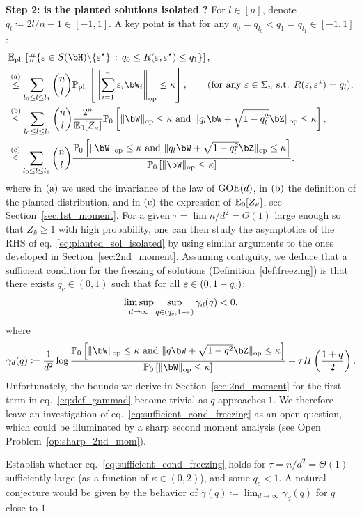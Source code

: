 \myskip
\textbf{Step 2: is the planted solutions isolated ?}
For $l \in [n]$, denote $q_l \coloneqq 2l/n - 1 \in [-1,1]$.
A key point is that for any $q_0 = q_{l_0} < q_1 = q_{l_1} \in [-1,1]$:
\begin{align}\label{eq:planted_sol_isolated}
    \nonumber
    &\EE_\pl \left[\# \{\eps \in S(\bH) \backslash \{\eps^\star\} \, : \, q_0 \leq R(\eps, \eps^\star) \leq q_1\}\right], \\ 
    \nonumber
    &\aleq \sum_{l_0 \leq l \leq l_1} \binom{n}{l} \bbP_{\pl} \left[\left\|\sum_{i=1}^n \eps_i \bW_i\right\|_\op \leq \kappa\right], \hspace{20pt} (\textrm{for any } \eps \in \Sigma_n \textrm{ s.t. } R(\eps, \eps^\star) = q_l), \\
    \nonumber
    &\bleq \sum_{l_0 \leq l \leq l_1}\binom{n}{l} \frac{2^n}{\EE_0[Z_\kappa]} \bbP_{0} \left[\|\bW\|_\op \leq \kappa \textrm{ and } \|q_l \bW + \sqrt{1-q_l^2} \bZ\|_\op \leq \kappa\right], \\
    &\cleq \sum_{l_0 \leq l \leq l_1}\binom{n}{l} \frac{\bbP_{0} \left[\|\bW\|_\op \leq \kappa \textrm{ and } \|q_l \bW + \sqrt{1-q_l^2} \bZ\|_\op \leq \kappa\right]}{\bbP_{0} \left[\|\bW\|_\op \leq \kappa\right]}.
\end{align}
where 
in $(\rm a)$ we used the invariance of the law of $\mathrm{GOE}(d)$, in $(\rm b)$ the definition of the planted distribution, and in $(\rm c)$ the expression of $\mathbb{E}_0[Z_\kappa]$, see Section~\ref{sec:1st_moment}.
For a given $\tau = \lim n / d^2 = \Theta(1)$ large enough so that $Z_k \geq 1$ with high probability,
one can then 
study the asymptotics of the RHS of eq.~\eqref{eq:planted_sol_isolated}
by using
similar arguments to the ones developed in Section~\ref{sec:2nd_moment}.
Assuming contiguity, 
we deduce that a sufficient condition for the freezing of solutions 
(Definition~\ref{def:freezing})
is that there exists $q_c \in (0,1)$ such that for all $\varepsilon \in (0, 1- q_c)$:
\begin{align}\label{eq:sufficient_cond_freezing}
    \limsup_{d \to \infty} \sup_{q \in (q_c, 1-\varepsilon)} \gamma_d(q) < 0,
\end{align}
where
\begin{align}\label{eq:def_gammad}
   \gamma_d(q) \coloneqq \frac{1}{d^2} \log \frac{\bbP_0 \left[\|\bW\|_\op \leq \kappa \textrm{ and } \|q \bW + \sqrt{1-q^2} \bZ\|_\op \leq \kappa\right]}{\bbP_0 \left[\|\bW\|_\op \leq \kappa\right]} + \tau H\left(\frac{1+q}{2}\right).
\end{align}
Unfortunately, the bounds we derive in Section~\ref{sec:2nd_moment} for the first term in eq.~\eqref{eq:def_gammad} become trivial as $q$ approaches $1$. 
We therefore leave an investigation of eq.~\eqref{eq:sufficient_cond_freezing} as an open question, which could be illuminated by a sharp second moment analysis (see Open Problem~\ref{op:sharp_2nd_mom}).
\begin{openquestion}[Second moment potential close to $q = 1$]
    Establish whether eq.~\eqref{eq:sufficient_cond_freezing} holds for $\tau = n /d^2 = \Theta(1)$ sufficiently large (as a function of $\kappa \in (0,2)$), and some $q_c < 1$.
    A natural conjecture would be given by the behavior of $\gamma(q) \coloneqq \lim_{d \to \infty} \gamma_d(q)$ for $q$ close to $1$.
\end{openquestion}